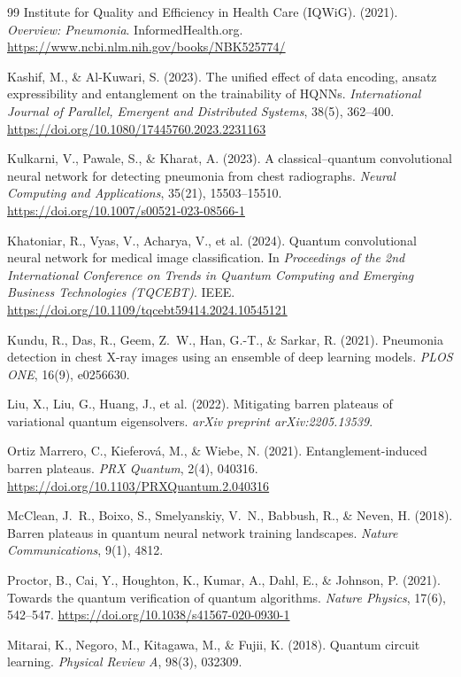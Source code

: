 \documentclass[11pt,a4paper]{article}
\begin{document}
\begin{thebibliography}{99}
Institute for Quality and Efficiency in Health Care (IQWiG). (2021).
\emph{Overview: Pneumonia}. InformedHealth.org.
\url{https://www.ncbi.nlm.nih.gov/books/NBK525774/}

Kashif, M., \& Al-Kuwari, S. (2023). The unified effect of data encoding,
ansatz expressibility and entanglement on the trainability of HQNNs.
\emph{International Journal of Parallel, Emergent and Distributed Systems},
38(5), 362--400.
\url{https://doi.org/10.1080/17445760.2023.2231163}

Kulkarni, V., Pawale, S., \& Kharat, A. (2023). A classical--quantum
convolutional neural network for detecting pneumonia from chest radiographs.
\emph{Neural Computing and Applications}, 35(21), 15503--15510.
\url{https://doi.org/10.1007/s00521-023-08566-1}

Khatoniar, R., Vyas, V., Acharya, V., et al. (2024). Quantum convolutional
neural network for medical image classification. In \emph{Proceedings of the
2nd International Conference on Trends in Quantum Computing and Emerging
Business Technologies (TQCEBT)}. IEEE.
\url{https://doi.org/10.1109/tqcebt59414.2024.10545121}

Kundu, R., Das, R., Geem, Z.~W., Han, G.-T., \& Sarkar, R. (2021). Pneumonia
detection in chest X-ray images using an ensemble of deep learning models.
\emph{PLOS ONE}, 16(9), e0256630.

Liu, X., Liu, G., Huang, J., et al. (2022). Mitigating barren plateaus of
variational quantum eigensolvers. \emph{arXiv preprint arXiv:2205.13539}.

Ortiz Marrero, C., Kieferov\'a, M., \& Wiebe, N. (2021).
Entanglement-induced barren plateaus. \emph{PRX Quantum}, 2(4), 040316.
\url{https://doi.org/10.1103/PRXQuantum.2.040316}

McClean, J.~R., Boixo, S., Smelyanskiy, V.~N., Babbush, R., \& Neven, H.
(2018). Barren plateaus in quantum neural network training landscapes.
\emph{Nature Communications}, 9(1), 4812.

Proctor, B., Cai, Y., Houghton, K., Kumar, A., Dahl, E., \& Johnson, P.
(2021). Towards the quantum verification of quantum algorithms.
\emph{Nature Physics}, 17(6), 542--547.
\url{https://doi.org/10.1038/s41567-020-0930-1}

Mitarai, K., Negoro, M., Kitagawa, M., \& Fujii, K. (2018). Quantum circuit
learning. \emph{Physical Review A}, 98(3), 032309.


\end{thebibliography}
\end{document}

